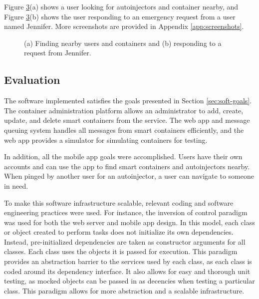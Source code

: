 Figure \ref{fig:mproto1-3-4}(a) shows a user looking for autoinjectors and container nearby, and Figure \ref{fig:mproto1-3-4}(b) shows the user responding to an emergency request from a user named Jennifer. More screenshots are provided in Appendix \ref{app:screenshots}.

\begin{figure}[h]
\centering
\begin{subfigure}{.5\textwidth}
  \centering
{}
\label{fig:mproto1-3}
\end{subfigure}%
\begin{subfigure}{.5\textwidth}
  \centering
{}
\label{fig:mproto1-4}
\end{subfigure}
\caption{(a) Finding nearby users and containers and (b) responding to a request from Jennifer.}
\label{fig:mproto1-3-4}
\end{figure}

\subsection{Evaluation} \label{sec:soft-eval}

The software implemented satisfies the goals presented in Section \ref{sec:soft-goals}. The container administration platform allows an administrator to add, create, update, and delete smart containers from the service. The web app and message queuing system handles all messages from smart containers efficiently, and the web app provides a simulator for simulating containers for testing.

In addition, all the mobile app goals were accomplished. Users have their own accounts and can use the app to find smart containers and autoinjectors nearby. When pinged by another user for an autoinjector, a user can navigate to someone in need.

To make this software infrastructure scalable, relevant coding and software engineering practices were used. For instance, the inversion of control paradigm was used for both the web server and mobile app design. In this model, each class or object created to perform tasks does not initialize its own dependencies. Instead, pre-initialized dependencies are taken as constructor arguments for all classes. Each class uses the objects it is passed for execution. This paradigm provides an abstraction barrier to the services used by each class, as each class is coded around its dependency interface. It also allows for easy and thorough unit testing, as mocked objects can be passed in as decencies when testing a particular class. This paradigm allows for more abstraction and a scalable infrastructure.

